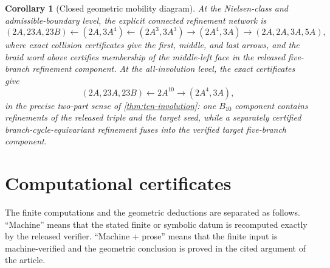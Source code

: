 \documentclass[11pt]{article}
\newtheorem{corollary}[theorem]{Corollary}
\theoremstyle{remark}
\begin{document}
\begin{corollary}[Closed geometric mobility diagram]\label{cor:mobility-network}
At the Nielsen-class and admissible-boundary level, the explicit connected refinement network is
\[
 (2A,23A,23B)
 \longleftarrow
 (2A,3A^4)
 \longleftarrow
 (2A^3,3A^3)
 \longrightarrow
 (2A^4,3A)
 \longrightarrow
 (2A,2A,3A,5A),
\]
where exact collision certificates give the first, middle, and last arrows, and the braid word above certifies membership of the middle-left face in the released five-branch refinement component.  At the all-involution level, the exact certificates give
\[
 (2A,23A,23B)
 \longleftarrow
 2A^{10}
 \longrightarrow
 (2A^4,3A),
\]
in the precise two-part sense of \cref{thm:ten-involution}: one $B_{10}$ component contains refinements of the released triple and the target seed, while a separately certified branch-cycle-equivariant refinement fuses into the verified target five-branch component.
\end{corollary}


\section{Computational certificates}\label{sec:repro}
The finite computations and the geometric deductions are separated as follows.  ``Machine'' means that the stated finite or symbolic datum is recomputed exactly by the released verifier.  ``Machine + prose'' means that the finite input is machine-verified and the geometric conclusion is proved in the cited argument of the article.
\end{document}
